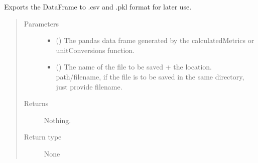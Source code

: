 \documentclass[letterpaper,10pt,openany,oneside,english]{sphinxmanual}
\begin{document}
\begin{fulllineitems}
\label{\detokenize{index:loadPullDataAnalysis.mdfParser.exportFiles}}
\sphinxAtStartPar
Exports the DataFrame to .csv and .pkl format for later use.
\begin{quote}\begin{description}
\item[{Parameters}] \leavevmode\begin{itemize}
\item {} 
\sphinxAtStartPar
{} () \textendash{} The pandas data frame generated by the calculatedMetrics or unitConversions function.

\item {} 
\sphinxAtStartPar
{} () \textendash{} The name of the file to be saved + the location. path/filename, if the file is to be
saved in the same directory, just provide filename.

\end{itemize}

\item[{Returns}] \leavevmode
\sphinxAtStartPar
Nothing.

\item[{Return type}] \leavevmode
\sphinxAtStartPar
None

\end{description}\end{quote}

\end{fulllineitems}

\end{document}
